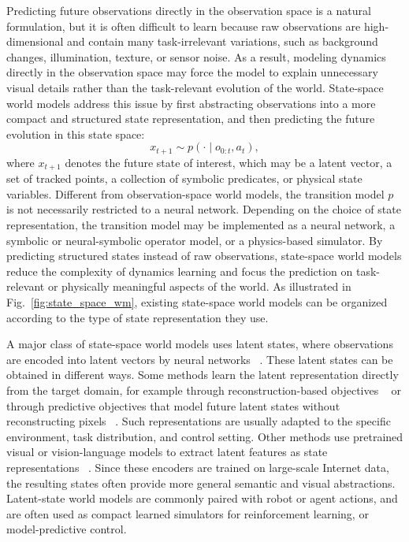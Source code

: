 Predicting future observations directly in the observation space is a natural formulation, but it is often difficult to learn because raw observations are high-dimensional and contain many task-irrelevant variations, such as background changes, illumination, texture, or sensor noise. As a result, modeling dynamics directly in the observation space may force the model to explain unnecessary visual details rather than the task-relevant evolution of the world. State-space world models address this issue by first abstracting observations into a more compact and structured state representation, and then predicting the future evolution in this state space:
\[
x_{t+1} \sim p(\cdot \mid o_{0:t}, a_t),
\]
where $x_{t+1}$ denotes the future state of interest, which may be a latent vector, a set of tracked points, a collection of symbolic predicates, or physical state variables. Different from observation-space world models, the transition model $p$ is not necessarily restricted to a neural network. Depending on the choice of state representation, the transition model may be implemented as a neural network, a symbolic or neural-symbolic operator model, or a physics-based simulator. By predicting structured states instead of raw observations, state-space world models reduce the complexity of dynamics learning and focus the prediction on task-relevant or physically meaningful aspects of the world. As illustrated in Fig.~\ref{fig:state_space_wm}, existing state-space world models can be organized according to the type of state representation they use.

A major class of state-space world models uses latent states, where observations are encoded into latent vectors by neural networks ~\cite{huang2025ladiwm,yin2025womap,jeong2025ocwm,zhou2024dinowm,maes2025leworldmodel,goswami2025osviwm,assran2025vjepa2,wu2022daydreamer,hafner2023dreamerv3,hansen2024tdmpc2}. These latent states can be obtained in different ways. Some methods learn the latent representation directly from the target domain, for example through reconstruction-based objectives ~\cite{wu2022daydreamer,hafner2023dreamerv3} or through predictive objectives that model future latent states without reconstructing pixels ~\cite{goswami2025osviwm,maes2025leworldmodel,assran2025vjepa2,hansen2024tdmpc2}. Such representations are usually adapted to the specific environment, task distribution, and control setting. Other methods use pretrained visual or vision-language models to extract latent features as state representations ~\cite{huang2025ladiwm,yin2025womap,jeong2025ocwm,zhou2024dinowm}. Since these encoders are trained on large-scale Internet data, the resulting states often provide more general semantic and visual abstractions. Latent-state world models are commonly paired with robot or agent actions, and are often used as compact learned simulators for reinforcement learning, or model-predictive control.

